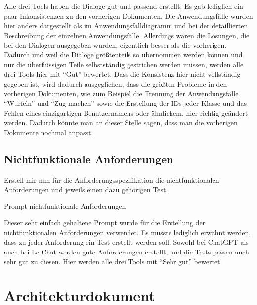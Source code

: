Alle drei Tools haben die Dialoge gut und passend erstellt. Es gab lediglich ein paar Inkonsistenzen zu den vorherigen Dokumenten. Die 
Anwendungsfälle wurden hier anders dargestellt als im Anwendungsfalldiagramm und bei der detaillierten Beschreibung der einzelnen Anwendungsfälle. 
Allerdings waren die Lösungen, die bei den Dialogen ausgegeben wurden, eigentlich besser als die vorherigen. Dadurch und weil die Dialoge 
größtenteils so übernommen werden können und nur die überflüssigen Teile selbstständig gestrichen werden müssen, werden alle drei Tools hier 
mit ``Gut'' bewertet. Dass die Konsistenz hier nicht vollständig gegeben ist, wird dadurch ausgeglichen, dass die größten Probleme in den 
vorherigen Dokumenten, wie zum Beispiel die Trennung der Anwendungsfälle ``Würfeln'' und ``Zug machen'' sowie die Erstellung der IDs jeder Klasse 
und das Fehlen eines einzigartigen Benutzernamens oder ähnlichem, hier richtig geändert werden. Dadurch könnte man an dieser Stelle sagen, dass 
man die vorherigen Dokumente nochmal anpasst. 

\subsection*{Nichtfunktionale Anforderungen}

\begin{prompt}[H]
    \begin{tcolorbox}[colback=gray!20, colframe=gray!20, boxrule=0pt, sharp corners] 
        Erstell mir nun für die Anforderungsspezifikation die nichtfunktionalen Anforderungen und jeweils einen dazu gehörigen Test.
        \vfill
    \end{tcolorbox}
    \caption{Prompt nichtfunktionale Anforderungen}
    \label{Prompt nichtfunktionale Anforderungen}
\end{prompt}

Dieser sehr einfach gehaltene Prompt wurde für die Erstellung der nichtfunktionalen Anforderungen verwendet. Es musste lediglich erwähnt werden, 
dass zu jeder Anforderung ein Test erstellt werden soll. Sowohl bei ChatGPT als auch bei Le Chat werden gute Anforderungen erstellt, und die 
Tests passen auch sehr gut zu diesen. Hier werden alle drei Tools mit ``Sehr gut'' bewertet.

\section{Architekturdokument}  \label{CompArchitekturdokument}

